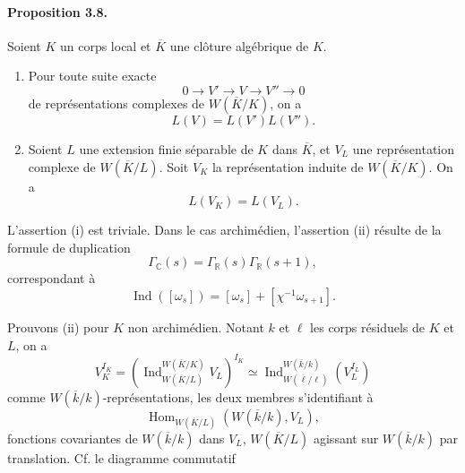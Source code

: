 \documentclass[10pt]{article}
\newcommand{\C}{\mathbb C}
\newcommand{\Hom}{\operatorname{Hom}}
\newcommand{\Ind}{\operatorname{Ind}}
\providecommand{\R}{\mathbb R}
\begin{document}
\paragraph{Proposition 3.8.} Soient \(K\) un corps local et \(\overline K\) une clôture algébrique de \(K\).
\begin{enumerate}[label=(\roman*)]
\item Pour toute suite exacte
\[
0\longrightarrow V'\longrightarrow V\longrightarrow V''\longrightarrow0
\]
de représentations complexes de \(W(\overline K/K)\), on a
\[
\tag{3.8.1}
L(V)=L(V')L(V'').
\]
\item Soient \(L\) une extension finie séparable de \(K\) dans \(\overline K\), et \(V_L\) une représentation complexe de \(W(\overline K/L)\). Soit \(V_K\) la représentation induite de \(W(\overline K/K)\). On a
\[
\tag{3.8.2}
L(V_K)=L(V_L).
\]
\end{enumerate}

L'assertion (i) est triviale. Dans le cas archimédien, l'assertion (ii) résulte de la formule de duplication
\[
\Gamma_\C(s)=\Gamma_\R(s)\Gamma_\R(s+1),
\]
correspondant à
\[
\Ind([\omega_s])=[\omega_s]+[\chi^{-1}\omega_{s+1}].
\]

Prouvons (ii) pour \(K\) non archimédien. Notant \(k\) et \(\ell\) les corps résiduels de \(K\) et \(L\), on a
\[
V_K^{I_K}=
\left(\Ind_{W(\overline K/L)}^{W(\overline K/K)}V_L\right)^{I_K}
\simeq
\Ind_{W(\overline\ell/\ell)}^{W(\overline k/k)}(V_L^{I_L})
\]
comme \(W(\overline k/k)\)-représentations, les deux membres s'identifiant à
\[
\Hom_{W(\overline K/L)}(W(\overline k/k),V_L),
\]
fonctions covariantes de \(W(\overline k/k)\) dans \(V_L\), \(W(\overline K/L)\) agissant sur \(W(\overline k/k)\) par translation. Cf. le diagramme commutatif
\end{document}
